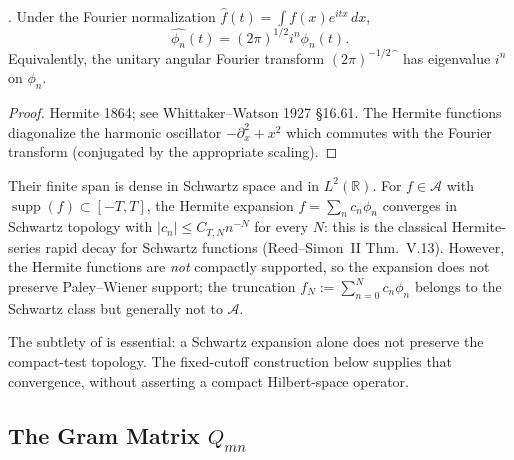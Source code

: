 \begin{proposition}
\label{v4-arith:w7-h:prop:hermite-self-reciprocal}
\ClaimStatusProvedElsewhere. Under the Fourier normalization
\(\widehat{f}(t)=\int f(x)e^{itx}\,dx\),
\begin{equation}
\label{v4-arith:w7-h:eq:hermite-fourier-factor}
\widehat{\phi_{n}}(t)=(2\pi)^{1/2}i^{n}\phi_{n}(t).
\end{equation}
Equivalently, the unitary angular Fourier transform
\((2\pi)^{-1/2}\widehat{\phantom f}\) has eigenvalue \(i^{n}\) on
\(\phi_{n}\).
\end{proposition}

\begin{proof}
Hermite 1864; see Whittaker--Watson 1927 \S16.61. The Hermite
functions diagonalize the harmonic oscillator \(-\partial_{x}^{2}+x^{2}\)
which commutes with the Fourier transform (conjugated by the
appropriate scaling).
\end{proof}

\begin{remark}
\label{v4-arith:w7-h:rem:hermite-dense}
Their finite span is dense in Schwartz space and in $L^2(\mathbb R)$.
For $f\in\mathscr A$ with
\(\operatorname{supp}(f)\subset[-T,T]\), the Hermite expansion
\(f=\sum_{n}c_{n}\phi_{n}\) converges in Schwartz topology with
\(|c_{n}|\leq C_{T,N}n^{-N}\) for every \(N\): this is the classical
Hermite-series rapid decay for Schwartz functions (Reed--Simon~II
Thm.~V.13). However, the Hermite functions are \emph{not} compactly
supported, so the expansion does not preserve Paley--Wiener support;
the truncation
\(f_{N}:=\sum_{n=0}^{N}c_{n}\phi_{n}\) belongs to the Schwartz class
but generally not to $\mathscr A$.
\end{remark}

The subtlety of  is essential:
a Schwartz expansion alone does not preserve the compact-test topology.
The fixed-cutoff construction below supplies that convergence, without
asserting a compact Hilbert-space operator.

\subsection{The Gram Matrix \(Q_{mn}\)}
\label{v4-arith:w7-h:hermite-basis:gram}

